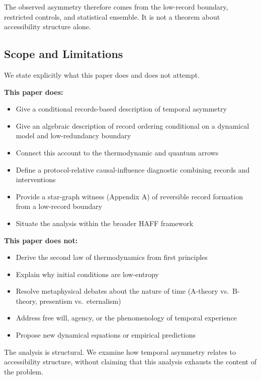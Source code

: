 \documentclass[12pt,a4paper,openany]{book}
\begin{document}
The observed asymmetry therefore comes from the low-record boundary, restricted controls, and statistical ensemble.  It is not a theorem about accessibility structure alone.

\subsection{Scope and Limitations}

We state explicitly what this paper does and does not attempt.

\textbf{This paper does:}
\begin{itemize}
    \item Give a conditional records-based description of temporal asymmetry
    \item Give an algebraic description of record ordering conditional on a dynamical model and low-redundancy boundary
    \item Connect this account to the thermodynamic and quantum arrows
    \item Define a protocol-relative causal-influence diagnostic combining records and interventions
    \item Provide a star-graph witness (Appendix A) of reversible record formation from a low-record boundary
    \item Situate the analysis within the broader HAFF framework
\end{itemize}

\textbf{This paper does not:}
\begin{itemize}
    \item Derive the second law of thermodynamics from first principles
    \item Explain why initial conditions are low-entropy
    \item Resolve metaphysical debates about the nature of time (A-theory vs.\ B-theory, presentism vs.\ eternalism)
    \item Address free will, agency, or the phenomenology of temporal experience
    \item Propose new dynamical equations or empirical predictions
\end{itemize}

The analysis is structural. We examine how temporal asymmetry relates to accessibility structure, without claiming that this analysis exhausts the content of the problem.
\end{document}
